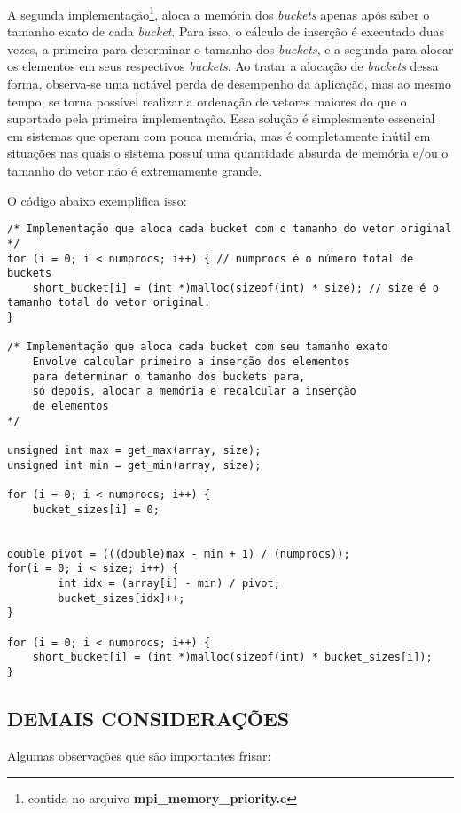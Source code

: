 		A segunda implementação\footnote{contida no arquivo \textbf{mpi\_memory\_priority.c}}, aloca a memória dos \textit{buckets} apenas após saber o tamanho exato de cada \textit{bucket}. Para isso, o cálculo de inserção é executado duas vezes, a primeira para determinar o tamanho dos \textit{buckets}, e a segunda para alocar os elementos em seus respectivos \textit{buckets}. Ao tratar a alocação de \textit{buckets} dessa forma, observa-se uma notável perda de desempenho da aplicação, mas ao mesmo tempo, se torna possível realizar a ordenação de vetores maiores do que o suportado pela primeira implementação. Essa solução é simplesmente essencial em sistemas que operam com pouca memória, mas é completamente inútil em situações nas quais o sistema possuí uma quantidade absurda de memória e/ou o tamanho do vetor não é extremamente grande.

		O código abaixo exemplifica isso:
		\begin{lstlisting}[style=C]
/* Implementação que aloca cada bucket com o tamanho do vetor original */
for (i = 0; i < numprocs; i++) { // numprocs é o número total de buckets
	short_bucket[i] = (int *)malloc(sizeof(int) * size); // size é o tamanho total do vetor original.
}

/* Implementação que aloca cada bucket com seu tamanho exato 
	Envolve calcular primeiro a inserção dos elementos 
	para determinar o tamanho dos buckets para,
	só depois, alocar a memória e recalcular a inserção
	de elementos	
*/

unsigned int max = get_max(array, size);
unsigned int min = get_min(array, size);

for (i = 0; i < numprocs; i++) {
	bucket_sizes[i] = 0;


double pivot = (((double)max - min + 1) / (numprocs));
for(i = 0; i < size; i++) {
    	int idx = (array[i] - min) / pivot;
    	bucket_sizes[idx]++;
}

for (i = 0; i < numprocs; i++) {
	short_bucket[i] = (int *)malloc(sizeof(int) * bucket_sizes[i]);
}
\end{lstlisting}
		
	\subsection{\normalsize DEMAIS CONSIDERAÇÕES}
		Algumas observações que são importantes frisar:
		
